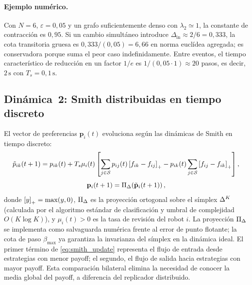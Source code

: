 \paragraph{Ejemplo numérico.}
Con $N=6$, $\varepsilon=0{,}05$ y un grafo suficientemente denso con
$\lambda_2\simeq1$, la constante de contracción es $0{,}95$. Si un cambio simultáneo
introduce $\Delta_{\mathrm{in}}\approx2/6=0{,}333$, la cota transitoria gruesa es
$0{,}333/(0{,}05)=6{,}66$ en norma euclídea agregada; es conservadora porque suma el
peor caso indefinidamente. Entre eventos, el tiempo característico de reducción en un
factor $1/e$ es $1/(0{,}05\cdot1)\approx20$ pasos, es decir, $2\,\text{s}$ con
$T_s=0{,}1\,\text{s}$.

\subsection{Dinámica~2: Smith distribuidas en tiempo discreto}
\label{subsec:smith}

El vector de preferencias $\mathbf{p}_i(t)$ evoluciona según las dinámicas de
Smith en tiempo discreto:
\begin{equation}
  \tilde{p}_{ik}(t+1) = p_{ik}(t) + T_s \mu_i(t) \left[
    \sum_{j \in \mathcal{S}} p_{ij}(t)\left[f_{ik} - f_{ij}\right]_{+}
    - p_{ik}(t) \sum_{j \in \mathcal{S}} \left[f_{ij} - f_{ik}\right]_{+}
  \right],
  \label{eq:smith_update}
\end{equation}
\begin{equation}
  \mathbf{p}_i(t+1) = \Pi_{\Delta}\!\left(\tilde{\mathbf{p}}_i(t+1)\right),
  \label{eq:proyeccion}
\end{equation}
donde $\left[y\right]_{+} = \max(y, 0)$, $\Pi_{\Delta}$ es la proyección ortogonal sobre
el símplex $\Delta^K$ (calculada por el algoritmo estándar de clasificación
y umbral de complejidad $O(K\log K)$), y $\mu_i(t) > 0$ es la tasa de revisión del robot $i$.
La proyección $\Pi_{\Delta}$ se implementa como salvaguarda numérica frente al
error de punto flotante; la cota de paso $\beta_{\max}$ ya garantiza la invarianza
del símplex en la dinámica ideal.
El primer término de \eqref{eq:smith_update} representa el flujo de entrada desde
estrategias con menor payoff; el segundo, el flujo de salida hacia estrategias con
mayor payoff. Esta comparación bilateral elimina la necesidad de conocer la media
global del payoff, a diferencia del replicador distribuido.

